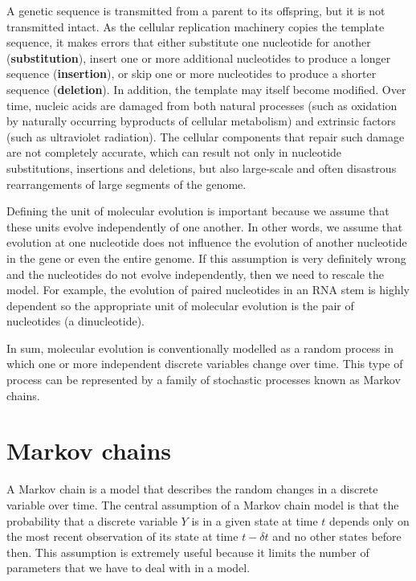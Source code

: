 \documentclass[12pt,twoside,openright]{book}
\begin{document}
A genetic sequence is transmitted from a parent to its offspring, but it is not transmitted intact.  As the cellular replication machinery copies the template sequence, it makes errors that either substitute one nucleotide for another (\textbf{substitution}), insert one or more additional nucleotides to produce a longer sequence (\textbf{insertion}), or skip one or more nucleotides to produce a shorter sequence (\textbf{deletion}).  In addition, the template may itself become modified.  Over time, nucleic acids are damaged from both natural processes (such as oxidation by naturally occurring byproducts of cellular metabolism) and extrinsic factors (such as ultraviolet radiation).  The cellular components that repair such damage are not completely accurate, which can result not only in nucleotide substitutions, insertions and deletions, but also large-scale and often disastrous rearrangements of large segments of the genome.

Defining the unit of molecular evolution is important because we assume that these units evolve independently of one another.  In other words, we assume that evolution at one nucleotide does not influence the evolution of another nucleotide in the gene or even the entire genome.  If this assumption is very definitely wrong and the nucleotides do not evolve independently, then we need to rescale the model.  For example, the evolution of paired nucleotides in an RNA stem is highly dependent \cite{Muse:1994} so the appropriate unit of molecular evolution is the pair of nucleotides (a dinucleotide).

In sum, molecular evolution is conventionally modelled as a random process in which one or more independent discrete variables change over time.  This type of process can be represented by a family of stochastic processes known as Markov chains.  


\section {Markov chains}

A Markov chain is a model that describes the random changes in a discrete variable over time.  The central assumption of a Markov chain model is that the probability that a discrete variable $Y$ is in a given state at time $t$ depends only on the most recent observation of its state at time $t-\delta t$ and no other states before then.  This assumption is extremely useful because it limits the number of parameters that we have to deal with in a model.  
\end{document}
